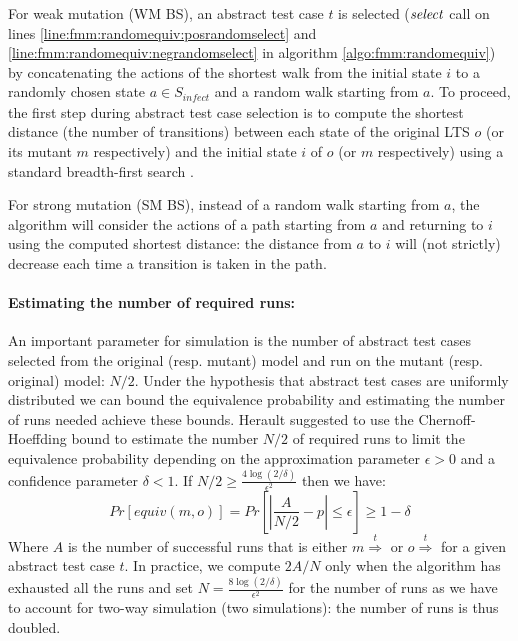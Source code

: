 For weak mutation (\gls{WM} \gls{BS}), an abstract test case $t$ is selected ($\mathit{select}$ call on lines \ref{line:fmm:randomequiv:posrandomselect} and \ref{line:fmm:randomequiv:negrandomselect} in algorithm \ref{algo:fmm:randomequiv}) by concatenating the actions of the shortest walk from the initial state $i$ to a randomly chosen state $a \in S_{\mathit{infect}}$ and a random walk starting from $a$. To proceed, the first step during abstract test case selection is to compute the shortest distance (\ie the number of transitions) between each state of the original LTS $o$ (or its mutant $m$ respectively) and the initial state $i$ of $o$ (or $m$ respectively) using a standard breadth-first search \cite{Cormen2001}. 

For strong mutation (\gls{SM} \gls{BS}), instead of a random walk starting from $a$, the algorithm will consider the actions of a path starting from $a$ and returning to $i$ using the computed shortest distance: the distance from $a$ to $i$ will (not strictly) decrease each time a transition is taken in the path.

\paragraph{Estimating the number of required runs:}

An important parameter for simulation is the number of abstract test cases selected from the original (resp. mutant) model and run on the mutant (resp. original) model: $N/2$. Under the hypothesis that abstract test cases are uniformly distributed we can bound the equivalence probability and estimating the number of runs needed achieve these bounds. Herault \etal \cite{Herault2004} suggested to use the Chernoff-Hoeffding bound to estimate the number $N/2$ of required runs to limit the equivalence probability depending on the approximation parameter $\epsilon > 0$ and a confidence parameter $\delta < 1$. If $N/2 \geq \frac{4\log(2/\delta)}{\epsilon^2} $ then we have: 
$$Pr \left[ equiv(m,o) \right] = Pr\left[ \left| \frac{A}{N/2}-p \right| \leq \epsilon \right] \geq 1-\delta$$
Where $A$ is the number of successful runs that is either $m \overset{t}{\Longrightarrow}$ or $o \overset{t}{\Longrightarrow}$ for a given abstract test case $t$.  In practice, we compute $2A/N$ only when the algorithm has exhausted all the runs and set $N=\frac{8\log(2/\delta)}{\epsilon^2}$ for the number of runs as we have to account for two-way simulation (\ie two simulations): the number of runs is thus doubled. 

